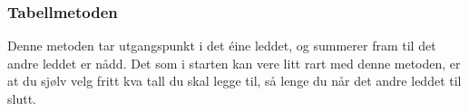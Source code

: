 \subsubsection{Tabellmetoden}
Denne metoden tar utgangspunkt i det éine leddet, og summerer fram til det andre leddet er nådd. Det som i starten kan vere litt rart med denne metoden, er at du sjølv velg fritt kva tall du skal legge til, så lenge du når det andre leddet til slutt.
\begin{center}
	\parbox{0.3\linewidth}{
	} \qquad
	\parbox{0.3\linewidth}{
	}
\end{center}
\newpage
